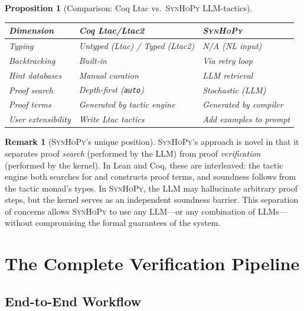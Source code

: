 \documentclass[11pt,a4paper]{report}
\theoremstyle{definition}
\newtheorem{remark}[definition]{Remark}
\theoremstyle{plain}
\newtheorem{proposition}[definition]{Proposition}
\newcommand{\synhopy}{\textsc{SynHoPy}}
\begin{document}
\begin{proposition}[Comparison: Coq Ltac vs.\ \synhopy{} LLM-tactics]
\label{prop:coq-comparison}
\begin{center}
\begin{tabular}{lll}
\toprule
\textbf{Dimension} & \textbf{Coq Ltac/Ltac2} & \textbf{\synhopy{}} \\
\midrule
Typing              & Untyped (Ltac) / Typed (Ltac2) & N/A (NL input) \\
Backtracking        & Built-in                       & Via retry loop \\
Hint databases      & Manual curation                & LLM retrieval \\
Proof search        & Depth-first (\texttt{auto})    & Stochastic (LLM) \\
Proof terms         & Generated by tactic engine     & Generated by compiler \\
User extensibility  & Write Ltac tactics             & Add examples to prompt \\
\bottomrule
\end{tabular}
\end{center}
\end{proposition}

\begin{remark}[\synhopy{}'s unique position]
\synhopy{}'s approach is novel in that it separates proof \emph{search}
(performed by the LLM) from proof \emph{verification} (performed by the
kernel).  In Lean and Coq, these are interleaved: the tactic engine both
searches for and constructs proof terms, and soundness follows from the
tactic monad's types.  In \synhopy{}, the LLM may hallucinate arbitrary proof
steps, but the kernel serves as an independent soundness barrier.  This
separation of concerns allows \synhopy{} to use any LLM---or any combination
of LLMs---without compromising the formal guarantees of the system.
\end{remark}


\chapter{The Complete Verification Pipeline}
\label{ch:pipeline}

\section{End-to-End Workflow}
\end{document}
